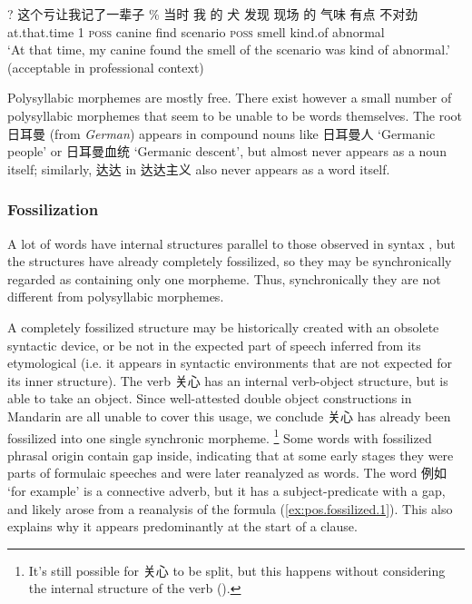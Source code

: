 \documentclass[UTF8, a4paper, oneside, scheme=plain, 12pt]{ctexrep}
\newcommand*{\citesec}[1]{\S~{#1}}
\newcommand{\form}[1]{\emph{#1}}
\newcommand{\translate}[1]{`#1'}
\newcommand*{\category}[1]{\textsc{#1}}
\begin{document}
\begin{exe}
    \ex\label{ex:pos.morpheme.kui-2} 
    ? 这个亏让我记了一辈子
    \ex\label{ex:pos.morpheme.quan} 
    \gll \% 当时 我 的 犬 发现 现场 的 气味 有点 不对劲 \\
    {} at.that.time 1 \category{poss} canine find scenario \category{poss} smell kind.of abnormal \\
    \glt \translate{At that time, my canine found the smell of the scenario was kind of abnormal.}
    (acceptable in professional context)
\end{exe}

Polysyllabic morphemes are mostly free. 
There exist however a small number of polysyllabic morphemes 
that seem to be unable to be words themselves. 
The root 日耳曼 (from \form{German}) 
appears in compound nouns like 日耳曼人 \translate{Germanic people} 
or 日耳曼血统 \translate{Germanic descent}, 
but almost never appears as a noun itself; 
similarly, 达达 in 达达主义 also never appears as a word itself.

\subsubsection{Fossilization}\label{sec:pos.morpheme.fossilization}

A lot of words have internal structures parallel to 
those observed in syntax \citep[\citesec{2.6}]{zhudexigrammar},
but the structures have already completely fossilized, 
so they may be synchronically regarded as containing only one morpheme.
Thus, synchronically they are not different from polysyllabic morphemes.

A completely fossilized structure 
may be historically created with an obsolete syntactic device, 
or be not in the expected part of speech inferred from its etymological
(i.e. it appears in syntactic environments that are not expected 
for its inner structure).
The verb 关心 has an internal verb-object structure, 
but is able to take an object.
Since well-attested double object constructions in Mandarin
are all unable to cover this usage,
we conclude 关心 has already been fossilized into one single synchronic morpheme.%
\footnote{
    It's still possible for 关心 to be split, 
    but this happens without considering the internal structure of the verb
    ().
}
Some words with fossilized phrasal origin 
contain gap inside, 
indicating that at some early stages 
they were parts of formulaic speeches 
and were later reanalyzed as words.
The word 例如 \translate{for example}
is a connective adverb, 
but it has a subject-predicate with a gap,
and likely arose from a reanalysis of the formula (\ref{ex:pos.fossilized.1}).
This also explains why it appears predominantly at the start of a clause.
\end{document}
